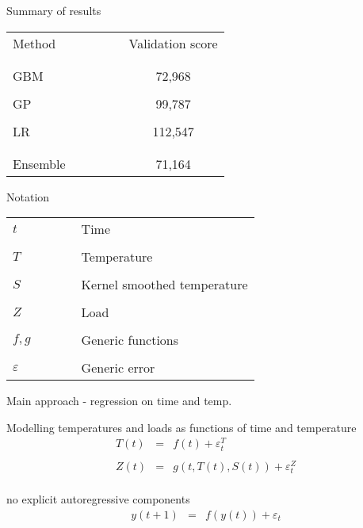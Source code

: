 \begin{frame}{Summary of results}
  \begin{center}
    \begin{tabular}{lcc|ccc}
      Method &&&&& Validation score\\\\
      \hline\\
      GBM &&&&& 72,968 \\\\
      GP &&&&& 99,787 \\\\
      LR &&&&& 112,547 \\\\
      \hline\\
      Ensemble &&&&& 71,164
    \end{tabular}
  \end{center}
\end{frame}

\begin{frame}{Notation}
  \begin{center}
    \begin{tabular}{lcccl}
      $t$ &&&& Time \\\\
      $T$ &&&& Temperature \\\\
      $S$ &&&& Kernel smoothed temperature \\\\
      $Z$ &&&& Load \\\\
      $f,g$ &&&& Generic functions \\\\
      $\varepsilon$ &&&& Generic error
    \end{tabular}
  \end{center}
\end{frame}

\begin{frame}{Main approach - regression on time and temp.}
  \begin{block}{Modelling temperatures and loads as functions of time and temperature}
    \begin{eqnarray*}
      T(t) & = & f(t) + \varepsilon^T_t \\
      \\
      Z(t) & = & g(t, T(t), S(t)) + \varepsilon^Z_t \\
    \end{eqnarray*}
  \end{block}
  \begin{block}{\ie no explicit autoregressive components \eg}
    \begin{eqnarray*}
      y(t+1) & = & f(y(t)) + \varepsilon_t
    \end{eqnarray*}
  \end{block}
\end{frame}

